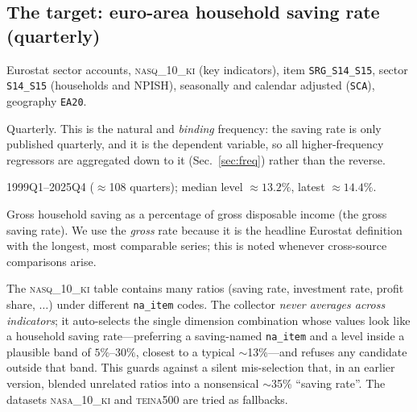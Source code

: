 \documentclass[11pt,a4paper]{article}
\newcommand{\code}[1]{\texttt{#1}}
\newcommand{\dataset}[1]{\textsc{#1}}
\begin{document}
\subsection{The target: euro-area household saving rate (quarterly)}
\begin{description}[leftmargin=1.4em,style=nextline]
\item[Source / code] Eurostat sector accounts, \dataset{nasq\_10\_ki} (key
  indicators), item \code{SRG\_S14\_S15}, sector \code{S14\_S15} (households and
  NPISH), seasonally and calendar adjusted (\code{SCA}), geography \code{EA20}.
\item[Frequency] Quarterly. This is the natural and \emph{binding} frequency: the
  saving rate is only published quarterly, and it is the dependent variable, so
  all higher-frequency regressors are aggregated down to it (Sec.~\ref{sec:freq})
  rather than the reverse.
\item[Coverage] 1999Q1--2025Q4 ($\approx$108 quarters); median level $\approx
  13.2\%$, latest $\approx 14.4\%$.
\item[Units] Gross household saving as a percentage of gross disposable income
  (the gross saving rate). We use the \emph{gross} rate because it is the
  headline Eurostat definition with the longest, most comparable series; this is
  noted whenever cross-source comparisons arise.
\item[Why this exact series] The \dataset{nasq\_10\_ki} table contains many
  ratios (saving rate, investment rate, profit share, $\ldots$) under different
  \code{na\_item} codes. The collector \emph{never averages across indicators};
  it auto-selects the single dimension combination whose values look like a
  household saving rate---preferring a saving-named \code{na\_item} and a level
  inside a plausible band of $5\%$--$30\%$, closest to a typical $\sim$13\%---and
  refuses any candidate outside that band. This guards against a silent
  mis-selection that, in an earlier version, blended unrelated ratios into a
  nonsensical $\sim$35\% ``saving rate''. The datasets \dataset{nasa\_10\_ki} and
  \dataset{teina500} are tried as fallbacks.
\end{description}

\end{document}
